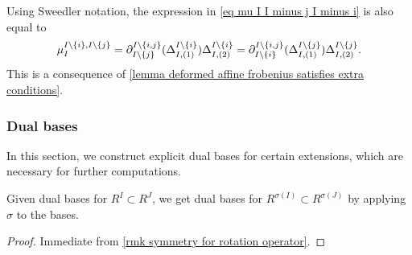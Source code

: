 \begin{remark}
    Using Sweedler notation, the expression in \cref{eq mu I I minus j I minus i} is also equal to 
    \begin{equation}  \mu_{I}^{I\setminus \{i\}, I\setminus \{j\}} =  \partial_{I\setminus \{j\}}^{I\setminus \{i,j\}}(\Delta^{I\setminus \{i\}}_{I,(1)})\Delta^{I\setminus \{i\}}_{I,(2)} = \partial_{I\setminus \{i\}}^{I\setminus \{i,j\}}(\Delta^{I\setminus \{j\}}_{I,(1)})\Delta^{I\setminus \{j\}}_{I,(2)}. \end{equation} This is a consequence of \cref{lemma deformed affine frobenius satisfies extra conditions}.
\end{remark}






\subsubsection{Dual bases}
\label{subsec-dual basis}

In this section, we construct explicit dual bases for certain extensions, which are necessary for further computations.

\begin{lemma} Given dual bases for $R^I \subset R^J$, we get dual bases for $R^{\sigma(I)} \subset R^{\sigma(J)}$ by applying $\sigma$ to the bases. \end{lemma}

\begin{proof} Immediate from \cref{rmk symmetry for rotation operator}. \end{proof}


